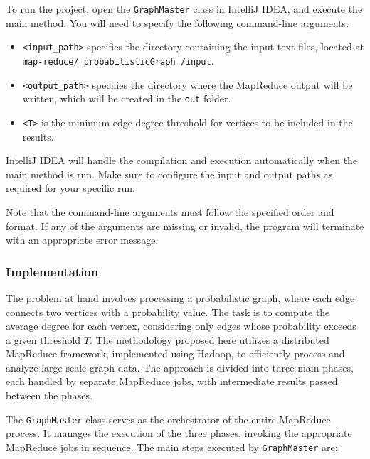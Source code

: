 \documentclass[acmlarge]{acmart}
\begin{document}
To run the project, open the \texttt{GraphMaster} class in IntelliJ IDEA, and execute the main method.
You will need to specify the following command-line arguments:

\begin{itemize}
  \item \texttt{<input\_path>} specifies the directory containing the input text files, located at
  \texttt{map-reduce/ probabilisticGraph /input}.
  \item \texttt{<output\_path>} specifies the directory where the MapReduce output will be written, which will be
        created in the \texttt{out} folder.
  \item \texttt{<T>} is the minimum edge-degree threshold for vertices to be included in the results.
\end{itemize}

IntelliJ IDEA will handle the compilation and execution automatically when the main method is run.
Make sure to configure the input and output paths as required for your specific run.

Note that the command-line arguments must follow the specified order and format.
If any of the arguments are missing or invalid, the program will terminate with an appropriate error message.

\subsubsection{Implementation}
The problem at hand involves processing a probabilistic graph, where each edge connects two vertices with a probability
value.
The task is to compute the average degree for each vertex, considering only edges whose probability exceeds a given
threshold \( T \).
The methodology proposed here utilizes a distributed MapReduce framework, implemented using Hadoop, to efficiently
process and analyze large-scale graph data.
The approach is divided into three main phases, each handled by separate MapReduce jobs, with intermediate results
passed between the phases.

The \texttt{GraphMaster} class serves as the orchestrator of the entire MapReduce process.
It manages the execution of the three phases, invoking the appropriate MapReduce jobs in sequence.
The main steps executed by \texttt{GraphMaster} are:
\end{document}
